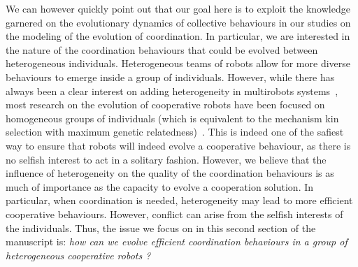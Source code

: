     We can however quickly point out that our goal here is to exploit the knowledge garnered on the evolutionary dynamics of collective behaviours in our studies on the modeling of the evolution of coordination. In particular, we are interested in the nature of the coordination behaviours that could be evolved between heterogeneous individuals. Heterogeneous teams of robots allow for more diverse behaviours to emerge inside a group of individuals. However, while there has always been a clear interest on adding heterogeneity in multirobots systems~\parencite{Parker1994, Parker2008}, most research on the evolution of cooperative robots have been focused on homogeneous groups of individuals (which is equivalent to the mechanism kin selection with maximum genetic relatedness)~\parencite{Waibel2009}. This is indeed one of the safiest way to ensure that robots will indeed evolve a cooperative behaviour, as there is no selfish interest to act in a solitary fashion. However, we believe that the influence of heterogeneity on the quality of the coordination behaviours is as much of importance as the capacity to evolve a cooperation solution. In particular, when coordination is needed, heterogeneity may lead to more efficient cooperative behaviours. However, conflict can arise from the selfish interests of the individuals. Thus, the issue we focus on in this second section of the manuscript is: \emph{how can we evolve efficient coordination behaviours in a group of heterogeneous cooperative robots ?}
